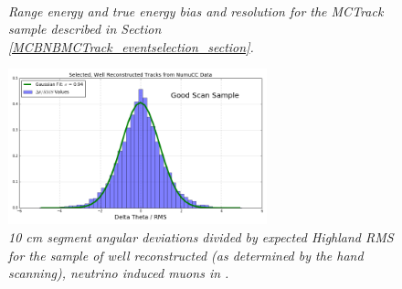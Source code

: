 \begin{figure}
\centering
\mbox{
	\quad
	}
\caption{\textit{Range energy and true energy bias and resolution for the {\sc MCTrack} sample described in Section \ref{MCBNBMCTrack_eventselection_section}.}}
\label{pub_plot_2}
\end{figure}

\begin{figure}
\centering
	\includegraphics[width=75mm]{Figures/Highland_validation_DataBNBSelectedRecoTrack_goodscan.png}
\caption{\textit{10 cm segment angular deviations divided by expected Highland RMS for the sample of well reconstructed (as determined by the hand scanning), neutrino induced muons in {\ub}.}}
\label{pub_plot_3}
\end{figure}


